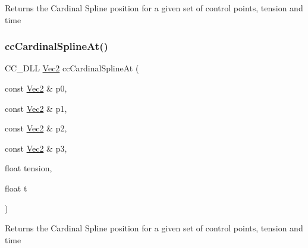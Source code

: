 Returns the Cardinal Spline position for a given set of control points, tension and time \mbox{\label{group__actions_ga24dfaba12398099e778c699dd10e7114}} 
\subsubsection{\texorpdfstring{cc\+Cardinal\+Spline\+At()}{ccCardinalSplineAt()}\hspace{0.1cm}{\footnotesize\ttfamily [2/2]}}
{\footnotesize\ttfamily C\+C\+\_\+\+D\+LL \hyperlink{classVec2}{Vec2} cc\+Cardinal\+Spline\+At (\begin{DoxyParamCaption}\item[{const \hyperlink{classVec2}{Vec2} \&}]{p0,  }\item[{const \hyperlink{classVec2}{Vec2} \&}]{p1,  }\item[{const \hyperlink{classVec2}{Vec2} \&}]{p2,  }\item[{const \hyperlink{classVec2}{Vec2} \&}]{p3,  }\item[{float}]{tension,  }\item[{float}]{t }\end{DoxyParamCaption})}

Returns the Cardinal Spline position for a given set of control points, tension and time 
